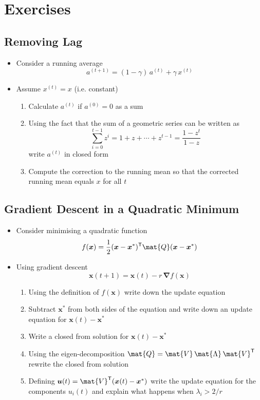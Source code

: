 \documentclass[11pt]{article}
\newcommand{\tr}{\textsf{T}}
\newcommand{\grad}{\bm{\nabla}}
\begin{document}
\section{Exercises}
\label{sec:org9facd13}

\subsection{Removing Lag}
\label{sec:org62ee7a7}
\begin{itemize}
\item Consider a running average
$$ a^{(t+1)} = (1-\gamma) \,a^{(t)} + \gamma \,x^{(t)} $$
\item Assume \(x^{(t)} = x\) (i.e. constant)
\begin{enumerate}
\item Calculate \(a^{(t)}\) if \(a^{(0)}=0\) as a sum
\item Using the fact that the sum of a geometric series can be written as
$$ \sum_{i=0}^{t-1} z^i = 1 + z+ \cdots + z^{t-1}= \frac{1-z^t}{1-z} $$
write \(a^{(t)}\) in closed form
\item Compute the correction to the running mean so that the
corrected running mean equals \(x\) for all \(t\)
\end{enumerate}
\end{itemize}

\subsection{Gradient Descent in a Quadratic Minimum}
\label{sec:org2d5a734}
\begin{itemize}
\item Consider minimising a quadratic function
$$ f(\bm{x}) = \frac{1}{2}(\bm{x}-\bm{x}^{*})^{\tr} \mat{Q} (\bm{x}-\bm{x}^{*}) $$
\item Using gradient descent
$$ \bm{x}(t+1) = \bm{x}(t) - r\, \grad f(\bm{x}) $$
\begin{enumerate}
\item Using the definition of \(f(\bm{x})\) write down the update
equation
\item Subtract \(\bm{x}^{*}\) from both sides of the equation and
write down an update equation for \(\bm{x}(t)-\bm{x}^{*}\)
\item Write a closed from solution for \(\bm{x}(t)-\bm{x}^{*}\)
\item Using the eigen-decomposition 
\(\mat{Q} = \mat{V}\,\mat{\Lambda}\,\mat{V}^{\tr}\)
rewrite the closed from solution
\item Defining \(\bm{u}(t) = \mat{V}^{\tr}(\bm{x}(t)-\bm{x}^{*})\) write the update
equation for the components \(u_{i}(t)\) and explain what
happens when \(\lambda_i > 2/r\)
\end{enumerate}
\end{itemize}
\end{document}
